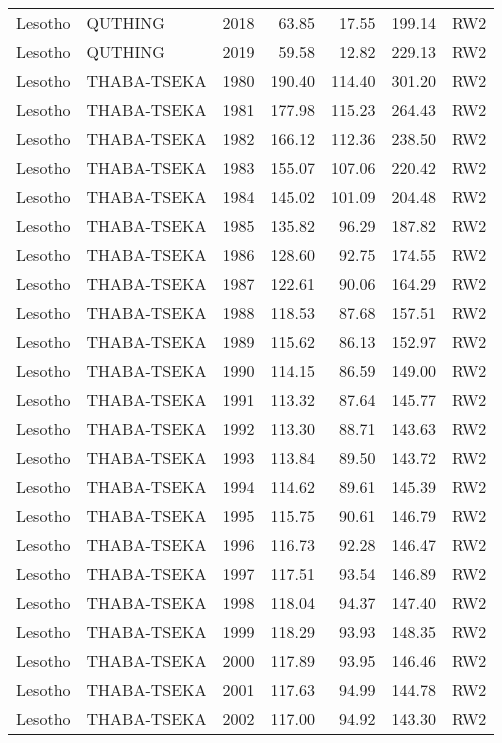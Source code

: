 \begin{longtable}{lllrrrl}
  Lesotho & QUTHING & 2018 & 63.85 & 17.55 & 199.14 & RW2 \\ 
  Lesotho & QUTHING & 2019 & 59.58 & 12.82 & 229.13 & RW2 \\ 
  Lesotho & THABA-TSEKA & 1980 & 190.40 & 114.40 & 301.20 & RW2 \\ 
  Lesotho & THABA-TSEKA & 1981 & 177.98 & 115.23 & 264.43 & RW2 \\ 
  Lesotho & THABA-TSEKA & 1982 & 166.12 & 112.36 & 238.50 & RW2 \\ 
  Lesotho & THABA-TSEKA & 1983 & 155.07 & 107.06 & 220.42 & RW2 \\ 
  Lesotho & THABA-TSEKA & 1984 & 145.02 & 101.09 & 204.48 & RW2 \\ 
  Lesotho & THABA-TSEKA & 1985 & 135.82 & 96.29 & 187.82 & RW2 \\ 
  Lesotho & THABA-TSEKA & 1986 & 128.60 & 92.75 & 174.55 & RW2 \\ 
  Lesotho & THABA-TSEKA & 1987 & 122.61 & 90.06 & 164.29 & RW2 \\ 
  Lesotho & THABA-TSEKA & 1988 & 118.53 & 87.68 & 157.51 & RW2 \\ 
  Lesotho & THABA-TSEKA & 1989 & 115.62 & 86.13 & 152.97 & RW2 \\ 
  Lesotho & THABA-TSEKA & 1990 & 114.15 & 86.59 & 149.00 & RW2 \\ 
  Lesotho & THABA-TSEKA & 1991 & 113.32 & 87.64 & 145.77 & RW2 \\ 
  Lesotho & THABA-TSEKA & 1992 & 113.30 & 88.71 & 143.63 & RW2 \\ 
  Lesotho & THABA-TSEKA & 1993 & 113.84 & 89.50 & 143.72 & RW2 \\ 
  Lesotho & THABA-TSEKA & 1994 & 114.62 & 89.61 & 145.39 & RW2 \\ 
  Lesotho & THABA-TSEKA & 1995 & 115.75 & 90.61 & 146.79 & RW2 \\ 
  Lesotho & THABA-TSEKA & 1996 & 116.73 & 92.28 & 146.47 & RW2 \\ 
  Lesotho & THABA-TSEKA & 1997 & 117.51 & 93.54 & 146.89 & RW2 \\ 
  Lesotho & THABA-TSEKA & 1998 & 118.04 & 94.37 & 147.40 & RW2 \\ 
  Lesotho & THABA-TSEKA & 1999 & 118.29 & 93.93 & 148.35 & RW2 \\ 
  Lesotho & THABA-TSEKA & 2000 & 117.89 & 93.95 & 146.46 & RW2 \\ 
  Lesotho & THABA-TSEKA & 2001 & 117.63 & 94.99 & 144.78 & RW2 \\ 
  Lesotho & THABA-TSEKA & 2002 & 117.00 & 94.92 & 143.30 & RW2 \\ 

\end{longtable}
